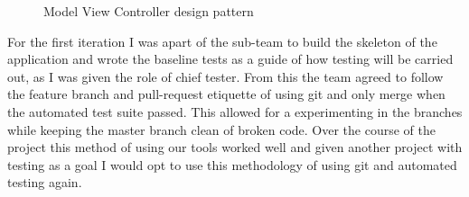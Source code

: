 \documentclass{style/CRPITStyle}
\begin{document}
\vspace{.1in}

\begin{figure}[htb]
\caption{\protect\label{mvc-pattern} Model View Controller design pattern }
\end{figure}

\vspace{.1in}

For the first iteration I was apart of the sub-team to build the skeleton of the
application and wrote the baseline tests as a guide of how testing will be
carried out, as I was given the role of chief tester. From this the team agreed
to follow the feature branch and pull-request etiquette of using git and only
merge when the automated test suite passed. This allowed for a experimenting in the
branches while keeping the master branch clean of broken code.
Over the course of the project this method of using our tools worked well and
given another project with testing as a goal I would opt to use this
methodology of using git and automated testing again.

\vspace{.1in}
\end{document}
